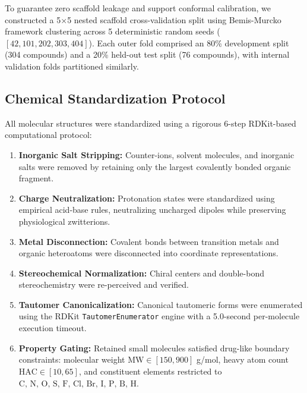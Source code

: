 \documentclass[journal]{IEEEtran}
\begin{document}
To guarantee zero scaffold leakage and support conformal calibration, we constructed a 5$\times$5 nested scaffold cross-validation split using Bemis-Murcko framework clustering across 5 deterministic random seeds ($[42, 101, 202, 303, 404]$). Each outer fold comprised an 80\% development split (304 compounds) and a 20\% held-out test split (76 compounds), with internal validation folds partitioned similarly.

\subsection{Chemical Standardization Protocol}
All molecular structures were standardized using a rigorous 6-step RDKit-based computational protocol:
\begin{enumerate}
    \item \textbf{Inorganic Salt Stripping:} Counter-ions, solvent molecules, and inorganic salts were removed by retaining only the largest covalently bonded organic fragment.
    \item \textbf{Charge Neutralization:} Protonation states were standardized using empirical acid-base rules, neutralizing uncharged dipoles while preserving physiological zwitterions.
    \item \textbf{Metal Disconnection:} Covalent bonds between transition metals and organic heteroatoms were disconnected into coordinate representations.
    \item \textbf{Stereochemical Normalization:} Chiral centers and double-bond stereochemistry were re-perceived and verified.
    \item \textbf{Tautomer Canonicalization:} Canonical tautomeric forms were enumerated using the RDKit \texttt{TautomerEnumerator} engine with a 5.0-second per-molecule execution timeout.
    \item \textbf{Property Gating:} Retained small molecules satisfied drug-like boundary constraints: molecular weight $\text{MW} \in [150, 900]$ g/mol, heavy atom count $\text{HAC} \in [10, 65]$, and constituent elements restricted to $\text{C, N, O, S, F, Cl, Br, I, P, B, H}$.
\end{enumerate}
\end{document}

